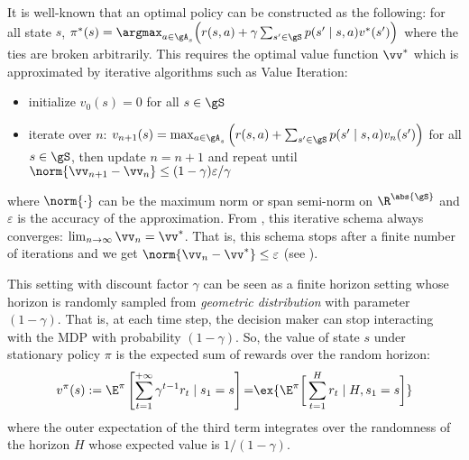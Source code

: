 It is well-known that an optimal policy can be constructed as the following: for all state $s$, $\pi^*(s)=\argmax_{a\in\gA_s}\Big(r(s, a) +\gamma\sum_{s'\in\gS}p(s'\mid s,a)v^*(s')\Big)$ where the ties are broken arbitrarily.
This requires the optimal value function $\vv^*$ which is approximated by iterative algorithms such as Value Iteration:
\begin{itemize}
    \item initialize $v_0(s)=0$ for all $s\in\gS$
    \item iterate over $n$: $v_{n+1}(s) = \max_{a\in\gA_s}\Big(r(s,a)+\sum_{s'\in\gS}p(s'\mid s,a)v_{n}(s')\Big)$ for all $s\in\gS$, then update $n=n+1$ and repeat until $\norm{\vv_{n+1}-\vv_n}\le(1-\gamma)\varepsilon/\gamma$
\end{itemize}
where $\norm{\cdot}$ can be the maximum norm or span semi-norm on $\R^{\abs{\gS}}$ and $\varepsilon$ is the accuracy of the approximation.
From \cite[Chapter~6]{puterman2014markov}, this iterative schema always converges: $\lim_{n\to\infty}\vv_n=\vv^*$.
That is, this schema stops after a finite number of iterations and we get $\norm{\vv_n-\vv^*}\le \varepsilon$ (see \cite[Theorem~6.3.1]{puterman2014markov}). 
%

This setting with discount factor $\gamma$ can be seen as a finite horizon setting whose horizon is randomly sampled from \emph{geometric distribution} with parameter $(1-\gamma)$.
That is, at each time step, the decision maker can stop interacting with the MDP with probability $(1-\gamma)$.
So, the value of state $s$ under stationary policy $\pi$ is the expected sum of rewards over the random horizon:
\begin{equation}
    \label{eq:discount_finite}
    v^\pi(s) :=\E^\pi\left[\sum_{t=1}^{+\infty} \gamma^{t-1}r_t \mid s_1=s\right] {=}\ex{\E^\pi\bigg[\sum_{t=1}^H r_t\mid H, s_1=s\bigg]}
\end{equation}
where the outer expectation of the third term integrates over the randomness of the horizon $H$ whose expected value is $1/(1-\gamma)$.

